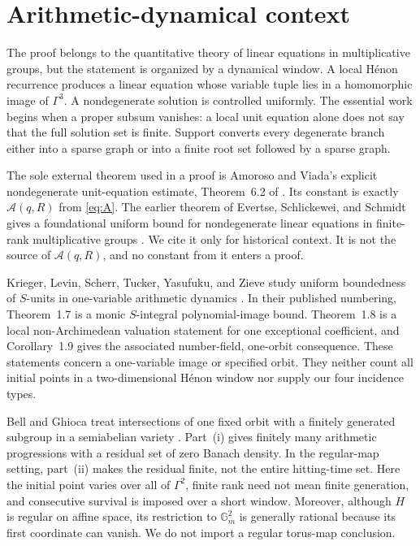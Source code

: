 \documentclass[11pt]{article}
\theoremstyle{definition}
\newcommand{\Acal}{\mathcal A}
\begin{document}
\section{Arithmetic-dynamical context}
\label{sec:context}

The proof belongs to the quantitative theory of linear equations in multiplicative groups, but the statement is organized by a dynamical window. A local Hénon recurrence produces a linear equation whose variable tuple lies in a homomorphic image of \(\Gamma^3\). A nondegenerate solution is controlled uniformly. The essential work begins when a proper subsum vanishes: a local unit equation alone does not say that the full solution set is finite. Support converts every degenerate branch either into a sparse graph or into a finite root set followed by a sparse graph.

The sole external theorem used in a proof is Amoroso and Viada's explicit nondegenerate unit-equation estimate, Theorem~6.2 of \cite{amorosoViada2009}. Its constant is exactly \(\Acal(q,R)\) from \eqref{eq:A}. The earlier theorem of Evertse, Schlickewei, and Schmidt gives a foundational uniform bound for nondegenerate linear equations in finite-rank multiplicative groups \cite[Theorem~1.1]{ess2002}. We cite it only for historical context. It is not the source of \(\Acal(q,R)\), and no constant from it enters a proof.

Krieger, Levin, Scherr, Tucker, Yasufuku, and Zieve study uniform boundedness of \(S\)-units in one-variable arithmetic dynamics \cite{kriegerEtAl2015}. In their published numbering, Theorem~1.7 is a monic \(S\)-integral polynomial-image bound. Theorem~1.8 is a local non-Archimedean valuation statement for one exceptional coefficient, and Corollary~1.9 gives the associated number-field, one-orbit consequence. These statements concern a one-variable image or specified orbit. They neither count all initial points in a two-dimensional Hénon window nor supply our four incidence types.

Bell and Ghioca treat intersections of one fixed orbit with a finitely generated subgroup in a semiabelian variety \cite[Theorem~1.1]{bellGhioca2024}. Part~(i) gives finitely many arithmetic progressions with a residual set of zero Banach density. In the regular-map setting, part~(ii) makes the residual finite, not the entire hitting-time set. Here the initial point varies over all of \(\Gamma^2\), finite rank need not mean finite generation, and consecutive survival is imposed over a short window. Moreover, although \(H\) is regular on affine space, its restriction to \(\mathbb G_m^2\) is generally rational because its first coordinate can vanish. We do not import a regular torus-map conclusion.
\end{document}
